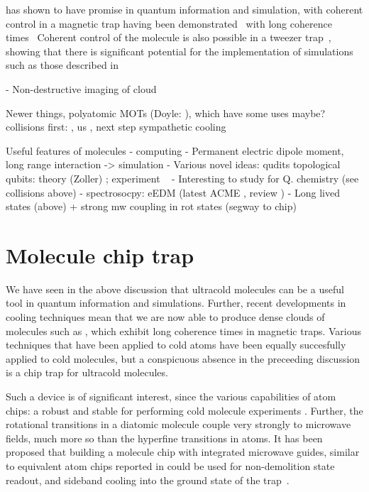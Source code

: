 \CaF{} has shown to have promise in quantum information and simulation, with
coherent control in a magnetic trap having been
demonstrated~\cite{WilliamsMagnetic2018, Blackmore_2018} with long coherence
times~\cite{PhysRevLett.124.063001}  Coherent control of the
molecule is also possible in a tweezer trap~\cite{PhysRevLett.127.123202},
showing that there is significant potential for the implementation of
simulations such as those described in 


- Non-destructive imaging of cloud \cite{PhysRevLett.121.083201}

Newer things, polyatomic MOTs (Doyle: \cite{Vilas2021}), which have some uses maybe? ~\cite{DoylePolyatomic2022}
collisions first: \cite{son2019collisional}, us \cite{Jurgilas2021, JurgilasPRL_2021}, next step sympathetic cooling

Useful features of molecules
- computing \cite{PhysRevLett.88.067901}
- Permanent electric dipole moment, long range interaction -> simulation
- Various novel ideas:
   qudits \cite{Sawant_2020}
   topological qubits: theory (Zoller) \cite{Micheli2006};  experiment ~\cite{Gross995}
- Interesting to study for Q. chemistry (see collisions above)
- spectrosocpy: eEDM
(latest ACME \cite{Andreev2018}, review \cite{ACMEreview})
- Long lived states (above) + strong mw coupling in rot states (segway to chip)


\section{Molecule chip trap}

We have seen in the above discussion that ultracold molecules can be a useful
tool in quantum information and simulations. Further, recent developments in
cooling techniques mean that we are now able to produce dense clouds of
molecules such as \CaF{}, which exhibit long coherence times in magnetic traps.
Various techniques that have been applied to cold atoms have been equally
succesfully applied to cold molecules, but a conspicuous absence in the
preceeding discussion is a chip trap for ultracold molecules.

Such a device is of significant interest, since the various capabilities of
atom chips: a robust and stable  for performing cold molecule
experiments . Further, the rotational transitions in
a diatomic molecule couple very strongly to microwave fields, much more so than
the hyperfine transitions in atoms. It has been proposed that building a
molecule chip with integrated microwave guides, similar to equivalent atom
chips reported in 
could be used for non-demolition state readout,  and
sideband cooling into the ground state of the trap~\cite{Andre2006}.

